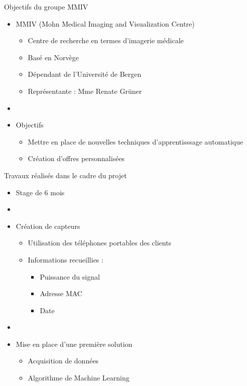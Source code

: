 \documentclass{beamer}
\begin{document}
\begin{frame}{Objectifs du groupe MMIV}
  \begin{itemize}
    \item MMIV (Mohn Medical Imaging and Visualization Centre)
    \begin{itemize}
      \item Centre de recherche en termes d'imagerie médicale
      \item Basé en Norvège
      \item Dépendant de l'Université de Bergen
      \item Représentante : Mme Renate Grüner
    \end{itemize}
    \item[]
    \item Objectifs
    \begin{itemize}
      \item Mettre en place de nouvelles techniques d'apprentisssage automatique
      \item Création d'offres personnalisées
    \end{itemize}
  \end{itemize}
\end{frame}

\begin{frame}{Travaux réalisés dans le cadre du projet}
  \begin{itemize}
    \item Stage de 6 mois
    \item[]
    \item Création de capteurs
    \begin{itemize}
      \item Utilisation des téléphones portables des clients
      \item Informations recueillies :
      \begin{itemize}
        \item Puissance du signal
        \item Adresse MAC
        \item Date
      \end{itemize}
    \end{itemize}
    \item[]
    \item Mise en place d'une première solution
    \begin{itemize}
      \item Acquisition de données
      \item Algorithme de Machine Learning
    \end{itemize}
  \end{itemize}
\end{frame}
\end{document}

